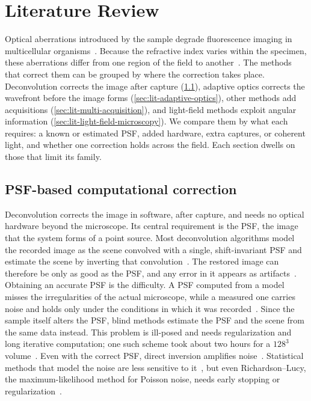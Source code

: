 \chapter{Literature Review}
\label{ch:literature-review}
Optical aberrations introduced by the sample degrade fluorescence imaging in multicellular organisms~\cite{ji2017adaptiveOpticalFluorescence}. Because the refractive index varies within the specimen, these aberrations differ from one region of the field to another~\cite{kam2001computationalAdaptiveOptics}. The methods that correct them can be grouped by where the correction takes place. Deconvolution corrects the image after capture (\cref{sec:lit-psf-correction}), adaptive optics corrects the wavefront before the image forms (\cref{sec:lit-adaptive-optics}), other methods add acquisitions (\cref{sec:lit-multi-acquisition}), and light-field methods exploit angular information (\cref{sec:lit-light-field-microscopy}). We compare them by what each requires: a known or estimated PSF, added hardware, extra captures, or coherent light, and whether one correction holds across the field. Each section dwells on those that limit its family.

\section{PSF-based computational correction}
\label{sec:lit-psf-correction}
Deconvolution corrects the image in software, after capture, and needs no optical hardware beyond the microscope. Its central requirement is the PSF, the image that the system forms of a point source. Most deconvolution algorithms model the recorded image as the scene convolved with a single, shift-invariant PSF and estimate the scene by inverting that convolution~\cite{sarder2006deconvolutionMethods,sibarita2005deconvolutionMicroscopy}. The restored image can therefore be only as good as the PSF, and any error in it appears as artifacts~\cite{sibarita2005deconvolutionMicroscopy,mcnally1999deconvolutionMicroscopy3d,preza2004depthVariantRestoration}. Obtaining an accurate PSF is the difficulty. A PSF computed from a model misses the irregularities of the actual microscope, while a measured one carries noise and holds only under the conditions in which it was recorded~\cite{hanser2004phaseRetrievedPupil}. Since the sample itself alters the PSF, blind methods estimate the PSF and the scene from the same data instead. This problem is ill-posed and needs regularization and long iterative computation; one such scheme took about two hours for a $128^3$ volume~\cite{kenig2010blindDeconvolutionLearning}. Even with the correct PSF, direct inversion amplifies noise~\cite{sarder2006deconvolutionMethods}. Statistical methods that model the noise are less sensitive to it~\cite{sibarita2005deconvolutionMicroscopy,mcnally1999deconvolutionMicroscopy3d}, but even Richardson--Lucy, the maximum-likelihood method for Poisson noise, needs early stopping or regularization~\cite{dey2006richardsonLucyTv}.


